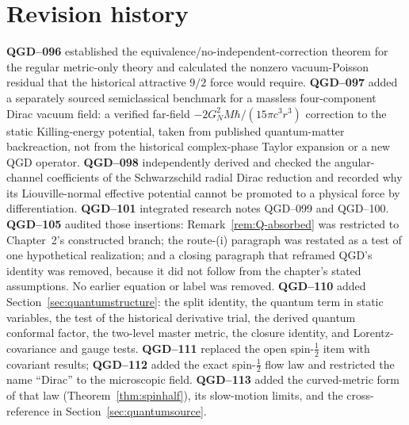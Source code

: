 \documentclass[11pt,a4paper]{article}
\begin{document}
\section*{Revision history}\label{sec:revision-history}
\textbf{QGD--096} established the equivalence/no-independent-correction
theorem for the regular metric-only theory and calculated the nonzero
vacuum-Poisson residual that the historical attractive $9/2$ force would
require. \textbf{QGD--097} added a separately sourced semiclassical
benchmark for a massless four-component Dirac vacuum field: a verified
far-field $-2G_N^2M\hbar/(15\pi c^3r^3)$ correction to the static
Killing-energy potential, taken from published quantum-matter backreaction,
not from the historical complex-phase Taylor expansion or a new QGD
operator. \textbf{QGD--098} independently derived and checked the
angular-channel coefficients of the Schwarzschild radial Dirac reduction and
recorded why its Liouville-normal effective potential cannot be promoted to
a physical force by differentiation. \textbf{QGD--101} integrated research
notes QGD--099 and QGD--100. \textbf{QGD--105} audited those insertions:
Remark~\ref{rem:Q-absorbed} was restricted to Chapter~2's constructed branch;
the route-(i) paragraph was restated as a test of one hypothetical realization;
and a closing paragraph that reframed QGD's identity was removed, because it
did not follow from the chapter's stated assumptions. No earlier equation or
label was removed. \textbf{QGD--110} added Section~\ref{sec:quantumstructure}: the
split identity, the quantum term in static variables, the test of the historical
derivative trial, the derived quantum conformal factor, the two-level master metric,
the closure identity, and Lorentz-covariance and gauge tests. \textbf{QGD--111} replaced
the open spin-$\frac12$ item with covariant results; \textbf{QGD--112} added the exact
spin-$\frac12$ flow law and restricted the name ``Dirac'' to the microscopic field.
\textbf{QGD--113} added the curved-metric form of that law (Theorem~\ref{thm:spinhalf}),
its slow-motion limits, and the cross-reference in Section~\ref{sec:quantumsource}.
\end{document}

